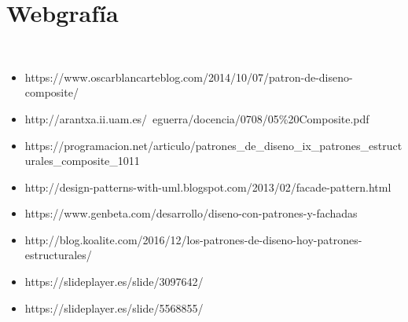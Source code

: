 \section{Webgrafía} 
\textbf{}\\
\begin{flushleft}

\begin{itemize}
	\item https://www.oscarblancarteblog.com/2014/10/07/patron-de-diseno-composite/
	\item http://arantxa.ii.uam.es/~eguerra/docencia/0708/05\%20Composite.pdf
	\item https://programacion.net/articulo/patrones\_de\_diseno\_ix\_patrones\_estructurales\_composite\_1011
          \item http://design-patterns-with-uml.blogspot.com/2013/02/facade-pattern.html
          \item https://www.genbeta.com/desarrollo/diseno-con-patrones-y-fachadas

         
          \item http://blog.koalite.com/2016/12/los-patrones-de-diseno-hoy-patrones-estructurales/
          
	\item https://slideplayer.es/slide/3097642/
           \item https://slideplayer.es/slide/5568855/
	

\end{itemize} 


\end{flushleft}